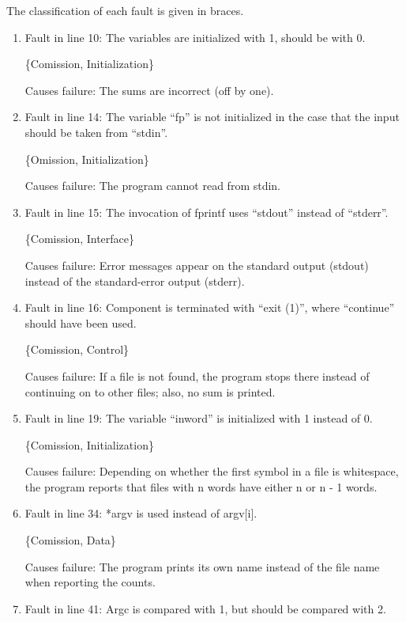 %
%

The classification of each fault is given in braces.

\begin{enumerate}

\item Fault in line 10: 
The variables are initialized with 1, should be with 0.

\{Comission, Initialization\}

Causes failure:
The sums are incorrect (off by one).

\item Fault in line 14: 
The variable ``fp'' is not initialized in the case that the input 
should be taken from ``stdin''.

\{Omission, Initialization\} 

Causes failure:
The program cannot read from stdin.


\item Fault in line 15: 
The invocation of fprintf uses ``stdout'' instead of ``stderr''.

\{Comission, Interface\} 

Causes failure:
Error messages appear on the standard output (stdout) instead of the
standard-error output (stderr).


\item Fault in line 16: 
Component is terminated with ``exit (1)'', where ``continue'' should
have been used.

\{Comission, Control\}

Causes failure:
If a file is not found, the program stops there instead of continuing
on to other files; also, no sum is printed.


\item Fault in line 19: 
The variable ``inword'' is initialized with 1 instead of 0.

 \{Comission, Initialization\}

Causes failure:
Depending on whether the first symbol in a file is whitespace, the
program reports that files with n words have either n or n - 1 words.


\item Fault in line 34: *argv is used instead of argv[i].

\{Comission, Data\}

Causes failure:
The program prints its own name instead of the file name when
reporting the counts.


\item Fault in line 41: Argc is compared with 1, but should be
compared with 2.


\end{enumerate}
